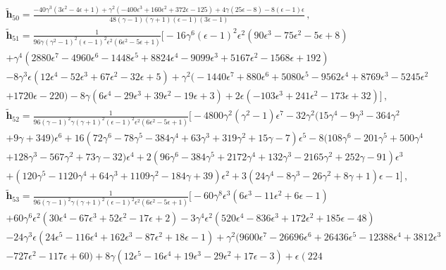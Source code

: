 \begin{align}
\begin{split}
&\boldsymbol{\tilde h}_{50}=\frac{-40 \gamma ^3 \left(3 \epsilon ^2-4 \epsilon +1\right)+\gamma ^2 \left(-400 \epsilon ^3+160 \epsilon ^2+372 \epsilon -125\right)+4 \gamma  (25 \epsilon -8)-8 (\epsilon -1) \epsilon }{48 (\gamma -1) (\gamma +1) (\epsilon -1) (3 \epsilon -1)}\,,\\&\boldsymbol{\tilde h}_{51}=\frac{1}{96 \gamma  \left(\gamma ^2-1\right)^2 (\epsilon -1)^2 \epsilon ^2 \left(6 \epsilon ^2-5 \epsilon +1\right)}\Bigg[-16 \gamma ^6 (\epsilon -1)^2 \epsilon ^2 \left(90 \epsilon ^3-75 \epsilon ^2-5 \epsilon +8\right)\\&+\gamma ^4 \left(2880 \epsilon ^7-4960 \epsilon ^6-1448 \epsilon ^5+8824 \epsilon ^4-9099 \epsilon ^3+5167 \epsilon ^2-1568 \epsilon +192\right)\\&-8 \gamma ^3 \epsilon  \left(12 \epsilon ^4-52 \epsilon ^3+67 \epsilon ^2-32 \epsilon +5\right)+\gamma ^2 \big(-1440 \epsilon ^7+880 \epsilon ^6+5080 \epsilon ^5-9562 \epsilon ^4+8769 \epsilon ^3-5245 \epsilon ^2\\&+1720 \epsilon -220\big)-8 \gamma  \left(6 \epsilon ^4-29 \epsilon ^3+39 \epsilon ^2-19 \epsilon +3\right)+2 \epsilon  \left(-103 \epsilon ^3+241 \epsilon ^2-173 \epsilon +32\right)\Bigg]\,,\\&\boldsymbol{\tilde h}_{52}=\frac{1}{96 (\gamma -1)^2 \gamma  (\gamma +1)^2 (\epsilon -1)^2 \epsilon ^2 \left(6 \epsilon ^2-5 \epsilon +1\right)}\Bigg[-4800 \gamma ^2 \left(\gamma ^2-1\right) \epsilon ^7-32 \gamma ^2 \big(15 \gamma ^4-9 \gamma ^3-364 \gamma ^2\\&+9 \gamma +349\big)\epsilon ^6+16 \left(72 \gamma ^6-78 \gamma ^5-384 \gamma ^4+63 \gamma ^3+319 \gamma ^2+15 \gamma -7\right) \epsilon ^5-8 \big(108 \gamma ^6-201 \gamma ^5+500 \gamma ^4\\&+128 \gamma ^3-567 \gamma ^2+73 \gamma -32\big) \epsilon ^4+2 \left(96 \gamma ^6-384 \gamma ^5+2172 \gamma ^4+132 \gamma ^3-2165 \gamma ^2+252 \gamma -91\right) \epsilon ^3\\&+\left(120 \gamma ^5-1120 \gamma ^4+64 \gamma ^3+1109 \gamma ^2-184 \gamma +39\right) \epsilon ^2+3 \left(24 \gamma ^4-8 \gamma ^3-26 \gamma ^2+8 \gamma +1\right) \epsilon -1\Bigg]\,,\\&\boldsymbol{\tilde h}_{53}=\frac{1}{96 (\gamma -1)^2 \gamma  (\gamma +1)^2 (\epsilon -1)^2 \epsilon ^2 \left(6 \epsilon ^2-5 \epsilon +1\right)}\Bigg[-60 \gamma ^8 \epsilon ^3 \left(6 \epsilon ^3-11 \epsilon ^2+6 \epsilon -1\right)\\&+60 \gamma ^6 \epsilon ^2 \left(30 \epsilon ^4-67 \epsilon ^3+52 \epsilon ^2-17 \epsilon +2\right)-3 \gamma ^4 \epsilon ^2 \left(520 \epsilon ^4-836 \epsilon ^3+172 \epsilon ^2+185 \epsilon -48\right)\\&-24 \gamma ^3 \epsilon  \left(24 \epsilon ^5-116 \epsilon ^4+162 \epsilon ^3-87 \epsilon ^2+18 \epsilon -1\right)+\gamma ^2 \big(9600 \epsilon ^7-26696 \epsilon ^6+26436 \epsilon ^5-12388 \epsilon ^4+3812 \epsilon ^3\\&-727 \epsilon ^2-117 \epsilon +60\big)+8 \gamma  \left(12 \epsilon ^5-16 \epsilon ^4+19 \epsilon ^3-29 \epsilon ^2+17 \epsilon -3\right)+\epsilon  \left(224 
\end{split}
\end{align}
